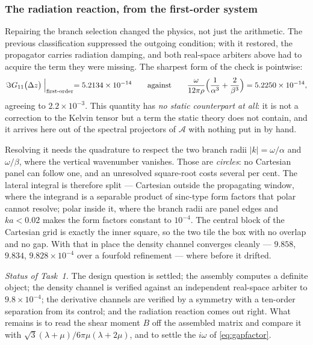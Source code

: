 \documentclass[11pt,a4paper]{article}
\newcommand{\Aop}{\mathcal{A}}
\begin{document}
\subsubsection*{The radiation reaction, from the first-order system}

Repairing the branch selection changed the physics, not just the arithmetic.  The
previous classification suppressed the outgoing condition; with it restored, the
propagator carries radiation damping, and both real-space arbiters above had to
acquire the term they were missing.  The sharpest form of the check is pointwise:
\begin{equation}\label{eq:radiation}
  \Im G_{11}\bigl(\Delta z\bigr)\Bigm|_{\text{first-order}} = 5.2134\times10^{-14}
  \qquad\text{against}\qquad
  \frac{\omega}{12\pi\rho}\Bigl(\frac{1}{\alpha^3} + \frac{2}{\beta^3}\Bigr)
  = 5.2250\times10^{-14},
\end{equation}
agreeing to $2.2\times10^{-3}$.  This quantity has \emph{no static counterpart at
all}: it is not a correction to the Kelvin tensor but a term the static theory
does not contain, and it arrives here out of the spectral projectors of $\Aop$
with nothing put in by hand.

Resolving it needs the quadrature to respect the two branch radii $|k| =
\omega/\alpha$ and $\omega/\beta$, where the vertical wavenumber vanishes.  Those
are \emph{circles}: no Cartesian panel can follow one, and an unresolved
square-root costs several per cent.  The lateral integral is therefore split ---
Cartesian outside the propagating window, where the integrand is a separable
product of sinc-type form factors that polar cannot resolve; polar inside it,
where the branch radii are panel edges and $ka < 0.02$ makes the form factors
constant to $10^{-4}$.  The central block of the Cartesian grid is exactly the
inner square, so the two tile the box with no overlap and no gap.  With that in
place the density channel converges cleanly --- $9.858$, $9.834$,
$9.828 \times 10^{-4}$ over a fourfold refinement --- where before it drifted.

\emph{Status of Task~1.}  The design question is settled; the assembly computes a
definite object; the density channel is verified against an independent
real-space arbiter to $9.8\times10^{-4}$; the derivative channels are verified by
a symmetry with a ten-order separation from its control; and the radiation
reaction comes out right.  What remains is to read the shear moment $B$ off the
assembled matrix and compare it with
$\sqrt3(\lambda+\mu)/6\pi\mu(\lambda+2\mu)$, and to settle the $i\omega$ of
\eqref{eq:gapfactor}.
\end{document}
